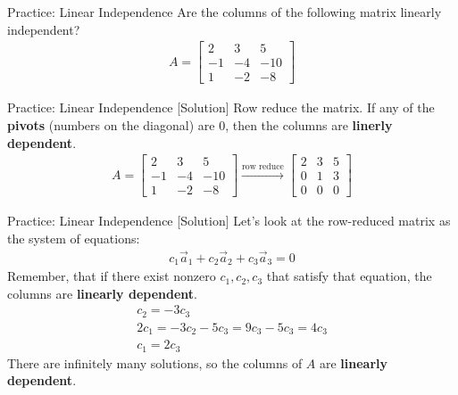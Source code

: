 \begin{frame}{Practice: Linear Independence}
    Are the columns of the following matrix linearly independent?
    \begin{align*}
        A = \begin{bmatrix}
            2 & 3 & 5 \\
            -1 & -4 & -10 \\
            1 & -2 & -8
        \end{bmatrix}
    \end{align*}
\end{frame}

\begin{frame}{Practice: Linear Independence [Solution]}
    Row reduce the matrix. If any of the \textbf{pivots} (numbers on the diagonal) are 0, then the columns are \textbf{linerly dependent}.
    \begin{align*}
        A = \begin{bmatrix}
            2 & 3 & 5 \\
            -1 & -4 & -10 \\
            1 & -2 & -8
        \end{bmatrix} \xrightarrow[]{\text{row reduce}} 
        \begin{bmatrix}
            2 & 3 & 5 \\
            0 & 1 & 3 \\
            0 & 0 & 0
        \end{bmatrix}
    \end{align*}
\end{frame}
\begin{frame}{Practice: Linear Independence [Solution]}
    Let's look at the row-reduced matrix as the system of equations:
    \begin{align*}
        c_1 \vec{a}_1 + c_2 \vec{a}_2 + c_3 \vec{a}_3 = 0
    \end{align*}
    Remember, that if there exist nonzero $c_1, c_2, c_3$ that satisfy that equation, the columns are \textbf{linearly dependent}. \\
    \begin{align*}
        c_2 = -3c_3 \\
        2c_1 = -3c_2 - 5c_3 = 9c_3 - 5c_3 = 4c_3 \\
        c_1 = 2c_3
    \end{align*}
    There are infinitely many solutions, so the columns of $A$ are \textbf{linearly dependent}.
\end{frame}
